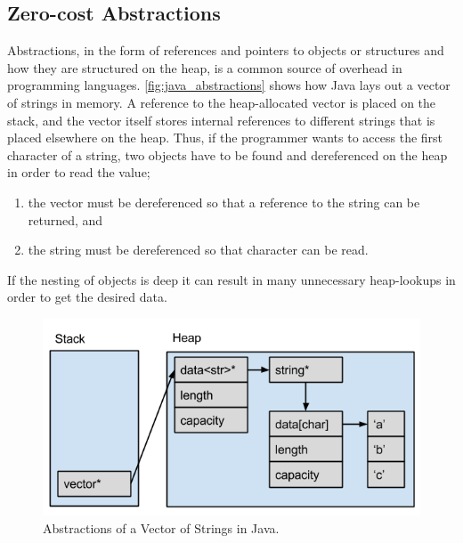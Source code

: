 \subsection{Zero-cost Abstractions}
\label{chap:zero_cost_abstractions}

Abstractions, in the form of references and pointers to objects or structures and how they are
structured on the heap, is a common source of overhead in programming languages.
\autoref{fig:java_abstractions}  shows how Java lays out a vector of
strings in memory.
A reference to the heap-allocated vector is placed on the stack, and the vector itself stores internal references to different strings that is placed elsewhere on the heap.
Thus, if the programmer wants to access the first character of a string, two objects have to be found and dereferenced on the heap in order to read the value;

\begin{enumerate}
  \item the vector must be dereferenced so that a reference to the string can be returned, and
  \item the string must be dereferenced so that character can be read.
\end{enumerate}

If the nesting of objects is deep it can result in many unnecessary heap-lookups in order to get the desired data.

\begin{figure}[tb]
  \begin{center}
    \includegraphics[scale=0.5]{figures/java_abstractions}
  \end{center}
  \caption{Abstractions of a Vector of Strings in Java.}
  \label{fig:java_abstractions}
\end{figure}

